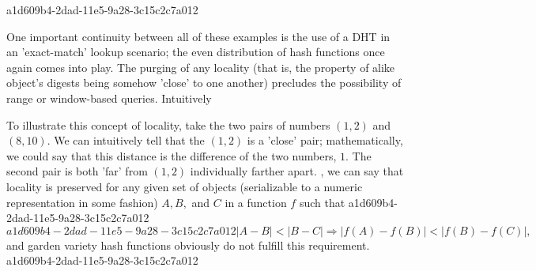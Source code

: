 \documentclass[12pt]{article}
\begin{document}
a1d609b4-2dad-11e5-9a28-3c15c2c7a012\par One important continuity between all of these examples is the use of a DHT in an 'exact-match' lookup scenario; the even distribution of hash functions once again comes into play. The purging of any locality (that is, the property of alike object's digests being somehow 'close' to one another) precludes the possibility of range or window-based queries. Intuitively

\par To illustrate this concept of locality, take the two pairs of numbers $(1,2)$ and $(8,10)$. We can intuitively tell that the $(1,2)$ is a 'close' pair; mathematically, we could say that this distance is the difference of the two numbers, $1$. The second pair is both 'far' from $(1,2)$ individually farther apart. , we can say that locality is preserved for any given set of objects (serializable to a numeric representation in some fashion) $A,B,$ and $C$ in a function $f$ such that
a1d609b4-2dad-11e5-9a28-3c15c2c7a012\begin{equation}
a1d609b4-2dad-11e5-9a28-3c15c2c7a012|A-B| < |B-C| \Rightarrow |f(A)-f(B)| < |f(B) - f(C)|,
\end{equation}
and garden variety hash functions obviously do not fulfill this requirement.
a1d609b4-2dad-11e5-9a28-3c15c2c7a012
\printbibliography
\end{document}
